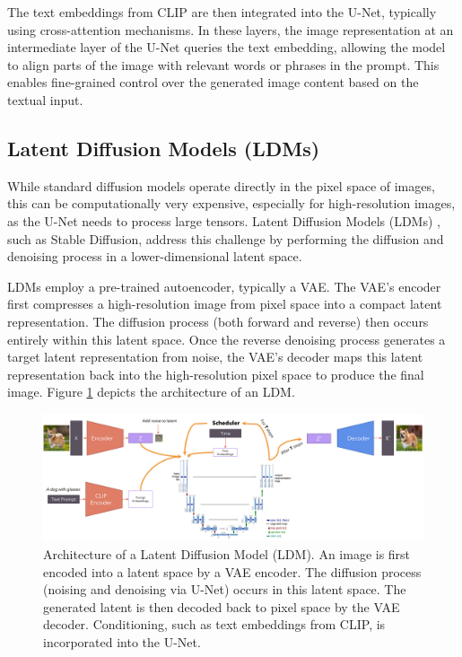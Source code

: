 The text embeddings from CLIP are then integrated into the U-Net, typically using cross-attention mechanisms. In these layers, the image representation at an intermediate layer of the U-Net queries the text embedding, allowing the model to align parts of the image with relevant words or phrases in the prompt. This enables fine-grained control over the generated image content based on the textual input.

\subsection{Latent Diffusion Models (LDMs)}\label{ssec:ldm}
While standard diffusion models operate directly in the pixel space of images, this can be computationally very expensive, especially for high-resolution images, as the U-Net needs to process large tensors. Latent Diffusion Models (LDMs) \cite{stablediffusion}, such as Stable Diffusion, address this challenge by performing the diffusion and denoising process in a lower-dimensional latent space.

LDMs employ a pre-trained autoencoder, typically a VAE. The VAE's encoder first compresses a high-resolution image from pixel space into a compact latent representation. The diffusion process (both forward and reverse) then occurs entirely within this latent space. Once the reverse denoising process generates a target latent representation from noise, the VAE's decoder maps this latent representation back into the high-resolution pixel space to produce the final image. Figure \ref{fig:ldm-architecture} depicts the architecture of an LDM.

\begin{figure}[h]
  \centering
  \includegraphics[width=\textwidth]{images/related-work/LDM-detailed.png}
  \caption{Architecture of a Latent Diffusion Model (LDM). An image is first encoded into a latent space by a VAE encoder. The diffusion process (noising and denoising via U-Net) occurs in this latent space. The generated latent is then decoded back to pixel space by the VAE decoder. Conditioning, such as text embeddings from CLIP, is incorporated into the U-Net.}
  \label{fig:ldm-architecture}
\end{figure}

